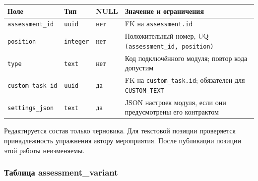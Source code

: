 \documentclass[12pt,a4paper]{article}
\newcounter{none} %
\begin{document}
\hypertarget{таблица-assessment_item}{}

{\def\LTcaptype{none} %
\begin{longtable}[]{@{}
  >{\raggedright\arraybackslash}p{}
  >{\raggedright\arraybackslash}p{}
  >{\raggedright\arraybackslash}p{}
  >{\raggedright\arraybackslash}p{}@{}}
\toprule\noalign{}
\begin{minipage}[b]{\linewidth}\raggedright
Поле
\end{minipage} & \begin{minipage}[b]{\linewidth}\raggedright
Тип
\end{minipage} & \begin{minipage}[b]{\linewidth}\raggedright
NULL
\end{minipage} & \begin{minipage}[b]{\linewidth}\raggedright
Значение и ограничения
\end{minipage} \\
\midrule\noalign{}
\endhead
\bottomrule\noalign{}
\endlastfoot
\texttt{assessment\_\allowbreak{}id} & \texttt{uuid} & нет & FK на \texttt{assessment.\allowbreak{}id} \\
\texttt{position} & \texttt{integer} & нет & Положительный номер, UQ \texttt{(assessment\_\allowbreak{}id, position)} \\
\texttt{type} & \texttt{text} & нет & Код подключённого модуля; повтор кода допустим \\
\texttt{custom\_\allowbreak{}task\_\allowbreak{}id} & \texttt{uuid} & да & FK на \texttt{custom\_\allowbreak{}task.\allowbreak{}id}; обязателен для \texttt{CUSTOM\_\allowbreak{}TEXT} \\
\texttt{settings\_\allowbreak{}json} & \texttt{text} & да & JSON настроек модуля, если они предусмотрены его контрактом \\
\end{longtable}
}

Редактируется состав только черновика. Для текстовой позиции проверяется принадлежность упражнения автору мероприятия. После публикации позиции этой работы неизменяемы.

\subsubsection{Таблица assessment\_variant}\label{ux442ux430ux431ux43bux438ux446ux430-assessment_variant}
\end{document}
